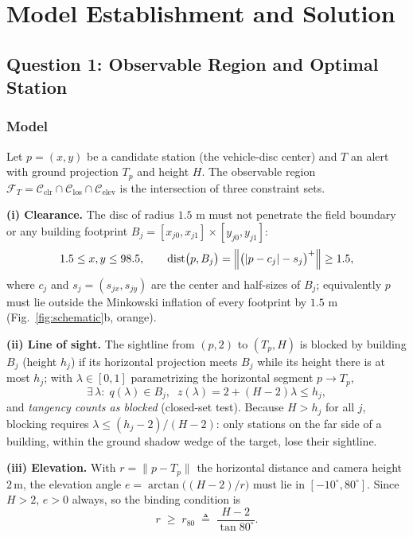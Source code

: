 \section{Model Establishment and Solution}

\subsection{Question 1: Observable Region and Optimal Station}\label{sec:q1}

\subsubsection{Model}

Let $p=(x,y)$ be a candidate station (the vehicle-disc center) and $T$ an alert with
ground projection $T_p$ and height $H$. The observable region
$\mathcal{F}_T=\mathcal{C}_{\mathrm{clr}}\cap\mathcal{C}_{\mathrm{los}}\cap\mathcal{C}_{\mathrm{elev}}$
is the intersection of three constraint sets.

\textbf{(i) Clearance.} The disc of radius $1.5$ m must not penetrate the field boundary
or any building footprint $B_j=[x_{j0},x_{j1}]\times[y_{j0},y_{j1}]$:
\begin{equation}\label{eq:clr}
1.5\le x,y\le98.5,\qquad
\operatorname{dist}\bigl(p,B_j\bigr)=\Bigl\|\bigl(|p-c_j|-s_j\bigr)^{+}\Bigr\|\ge1.5,
\end{equation}
where $c_j$ and $s_j=(s_{jx},s_{jy})$ are the center and half-sizes of $B_j$; equivalently
$p$ must lie outside the Minkowski inflation of every footprint by $1.5$ m
(Fig.~\ref{fig:schematic}b, orange).

\textbf{(ii) Line of sight.} The sightline from $(p,2)$ to $(T_p,H)$ is blocked by
building $B_j$ (height $h_j$) if its horizontal projection meets $B_j$ while its height
there is at most $h_j$; with $\lambda\in[0,1]$ parametrizing the horizontal segment
$p\to T_p$,
\begin{equation}\label{eq:los}
\exists\,\lambda:\; q(\lambda)\in B_j,\;\; z(\lambda)=2+(H-2)\lambda\le h_j ,
\end{equation}
and \emph{tangency counts as blocked} (closed-set test). Because $H>h_j$ for all $j$,
blocking requires $\lambda\le(h_j-2)/(H-2)$: only stations on the far side of a building,
within the ground shadow wedge of the target, lose their sightline.

\textbf{(iii) Elevation.} With $r=\|p-T_p\|$ the horizontal distance and camera height
$2\,\mathrm{m}$, the elevation angle $e=\arctan\bigl((H-2)/r\bigr)$ must lie in
$[-10^\circ,80^\circ]$. Since $H>2$, $e>0$ always, so the binding condition is
\begin{equation}\label{eq:elev}
r\;\ge\;r_{80}\;\triangleq\;\frac{H-2}{\tan 80^\circ}.
\end{equation}


